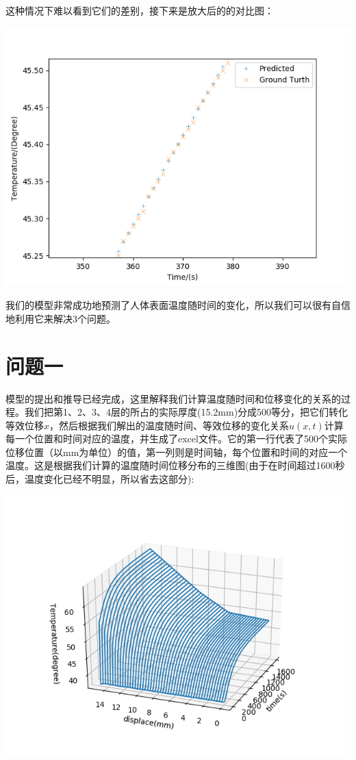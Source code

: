 \documentclass[bwprint]{cumcmthesis}
\begin{document}
    \indent 这种情况下难以看到它们的差别，接下来是放大后的的对比图：
    \begin{flushleft}
        \includegraphics[scale=1]{Problem11.png}
    \end{flushleft}
    \indent 我们的模型非常成功地预测了人体表面温度随时间的变化，所以我们可以很有自信地利用它来解决3个问题。

\section{问题一}
\indent 模型的提出和推导已经完成，这里解释我们计算温度随时间和位移变化的关系的过程。我们把第1、2、3、4层的所占的实际厚度(15.2mm)分成500等分，把它们转化等效位移$x$，然后根据我们解出的温度随时间、等效位移的变化关系$u(x,t)$计算每一个位置和时间对应的温度，并生成了excel文件。它的第一行代表了500个实际位移位置（以mm为单位）的值，第一列则是时间轴，每个位置和时间的对应一个温度。这是根据我们计算的温度随时间位移分布的三维图(由于在时间超过1600秒后，温度变化已经不明显，所以省去这部分):
\begin{flushleft}
    \includegraphics[scale=1]{Problem_12.png}
\end{flushleft}
\end{document}
